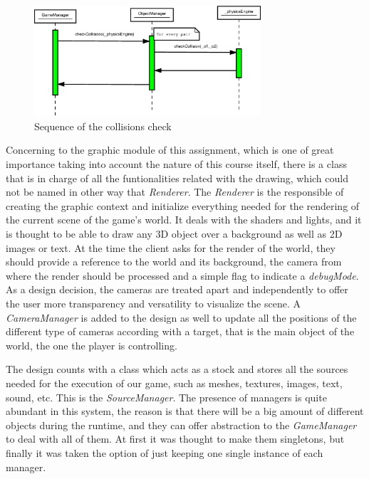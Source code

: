 \documentclass[]{article}
\begin{document}
\begin{figure}[h]
\begin{center}
\includegraphics[width=0.75\textwidth]{images/physicsEngineSec.eps}
\caption{Sequence of the collisions check}
\label{fig:pesec}
\end{center}
\end{figure}

Concerning to the graphic module of this assignment, which is one of great importance taking into account the nature of this course itself, there is a class that is in charge of all the funtionalities
related with the drawing, which could not be named in other way that \emph{Renderer}. The \emph{Renderer} is the responsible of creating the graphic context and initialize everything needed for the
rendering of the current scene of the game's world. It deals with the shaders and lights, and it is thought to be able to draw any 3D object over a background as well as 2D images or text. At the time 
the client asks for the render of the world, they should provide a reference to the world and its background, the camera from where the render should be processed and a simple flag to indicate a \emph{debugMode}.
As a design decision, the cameras are treated apart and independently to offer the user more transparency and versatility to visualize the scene. A \emph{CameraManager} is added to the design as well to
update all the positions of the different type of cameras according with a target, that is the main object of the world, the one the player is controlling.

The design counts with a class which acts as a stock and stores all the sources needed for the execution of our game, such as meshes, textures, images, text, sound, etc. This is the 
\emph{SourceManager}. The presence of managers is quite abundant in this system, the reason is that there will be a big amount of different objects during the runtime, and they can offer abstraction
to the \emph{GameManager} to deal with all of them. At first it was thought to make them singletons, but finally it was taken the option of just keeping one single instance of each manager.
\end{document}
